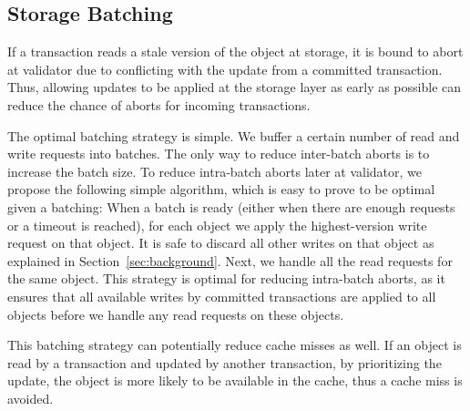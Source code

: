\subsection{Storage Batching}
If a transaction reads a stale version of the object at storage, it is bound to abort at validator due to conflicting with the update from a committed transaction. Thus, allowing updates to be applied at the storage layer as early as possible can reduce the chance of aborts for incoming transactions.

The optimal batching strategy is simple. We buffer a certain number of read and write requests into batches. The only way to reduce inter-batch aborts is to increase the batch size. To reduce intra-batch aborts later at validator, we propose the following simple algorithm, which is easy to prove to be optimal given a batching:  When a batch is ready (either when there are enough requests or a timeout is reached), for each object we apply the highest-version write request on that object. It is safe to discard all other writes on that object as explained in Section~\ref{sec:background}. Next, we handle all the read requests for the same object. This strategy is optimal for reducing intra-batch aborts, as it ensures that all available writes by committed transactions are applied to all objects before we handle any read requests on these objects. 

This batching strategy can potentially reduce cache misses as well. If an object is read by a transaction and updated by another transaction, by prioritizing the update, the object is more likely to be available in the cache, thus a cache miss is avoided. 


